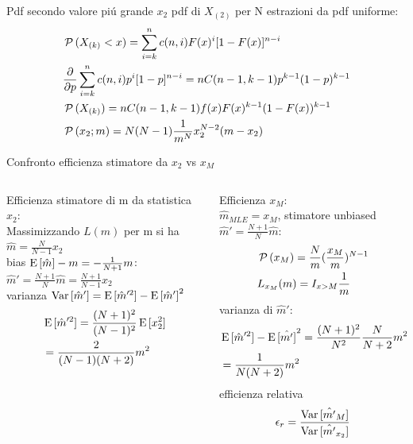 \documentclass[asd-beamer.tex]{subfiles}
\begin{document}
\begin{frame}{Pdf secondo valore pi\'u grande $x_2$}
pdf di $X_{(2)}$ per N estrazioni da pdf uniforme:
\begin{align*}
&\operatorname{\mathcal{P}}{(X_{(k)}<x)}=\sum_{i=k}^nc(n,i)F(x)^i[1-F(x)]^{n-i}\\
&\frac{\partial}{\partial p}\sum_{i=k}^nc(n,i)p^{i}[1-p]^{n-i}=nC(n-1,k-1)p^{k-1}(1-p)^{k-1}\\
&\operatorname{\mathcal{P}}{(X_{(k)})}=nC(n-1,k-1)f(x)F(x)^{k-1}(1-F(x))^{k-1}\\
&\operatorname{\mathcal{P}}{(x_2;m)}=N(N-1)\frac{1}{m^N}x_2^{N-2}(m-x_2)
\end{align*}
\end{frame}

\begin{frame}{Confronto efficienza stimatore da $x_2$ vs $x_M$}
\begin{columns}[T]
\begin{column}{0.5\textwidth}
Efficienza stimatore di m da statistica $x_2$:\\
Massimizzando $L(m)$ per m si ha $\hat{m}=\frac{N}{N-1}x_2$\\
bias $\operatorname{E}{[\hat{m}]}-m=-\frac{1}{N+1}m$:\\ $\hat{m}'=\frac{N+1}{N}\hat{m}=\frac{N+1}{N-1}x_2$\\
varianza $\operatorname{Var}{[\hat{m}']}=\operatorname{E}{[\hat{m}'^2]}-\operatorname{E}{[\hat{m}']}^2$
\begin{align*}
&\operatorname{E}{[\hat{m}'^2]}=\frac{(N+1)^2}{(N-1)^2}\operatorname{E}{[x_2^2]}\\
&=\frac{2}{(N-1)(N+2)}m^2
\end{align*}
\end{column}
\begin{column}{0.5\textwidth}
Efficienza $x_M$:\\
$\hat{m}_{MLE}=x_M$, stimatore unbiased $\hat{m}'=\frac{N+1}{N}\hat{m}$:
\begin{align*}
&\operatorname{\mathcal{P}}{(x_M)}=\frac{N}{m}(\frac{x_M}{m})^{N-1}\\
&L_{x_M}(m)=I_{x>M}\frac{1}{m}
\end{align*}
varianza di $\hat{m}'$:
\begin{align*}
&\operatorname{E}{[\hat{m}'^2]}-\operatorname{E}{[\hat{m'}]}^2=\frac{(N+1)^2}{N^2}\frac{N}{N+2}m^2-m^2\\
&=\frac{1}{N(N+2)}m^2
\end{align*}
efficienza relativa
\begin{equation*}
\epsilon_r=\frac{\operatorname{Var}{[\hat{m'}_{M}]}}{\operatorname{Var}{[\hat{m'}_{x_2}]}}
\end{equation*}
\end{column}
\end{columns}
\end{frame}
\end{document}
